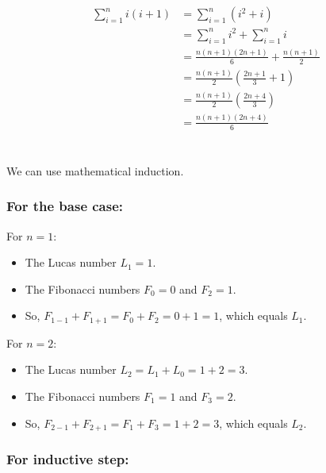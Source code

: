 \documentclass{article}
\begin{document}
\section{}

\begin{align*}
\sum_{i=1}^{n} i(i+1) &= \sum_{i=1}^{n} (i^2 + i) \\
&= \sum_{i=1}^{n} i^2 + \sum_{i=1}^{n} i \\
&= \frac{n(n + 1)(2n + 1)}{6} + \frac{n(n+1)}{2} \\
&= \frac{n(n+1)}{2} \left( \frac{2n+1}{3} + 1 \right) \\
&= \frac{n(n+1)}{2} \left( \frac{2n+4}{3} \right) \\
&= \frac{n(n+1)(2n+4)}{6}
\end{align*}


\section{}

We can use mathematical induction. 

\subsubsection*{For the base case:}

For \(n = 1\):
\begin{itemize}
    \item The Lucas number \(L_1 = 1\).
    \item The Fibonacci numbers \(F_0 = 0\) and \(F_2 = 1\).
    \item So, \(F_{1-1} + F_{1+1} = F_0 + F_2 = 0 + 1 = 1\), which equals \(L_1\).
\end{itemize}

For \(n = 2\):
\begin{itemize}
    \item The Lucas number \(L_2 = L_1 + L_0 = 1 + 2 = 3\).
    \item The Fibonacci numbers \(F_1 = 1\) and \(F_3 = 2\).
    \item So, \(F_{2-1} + F_{2+1} = F_1 + F_3 = 1 + 2 = 3\), which equals \(L_2\).
\end{itemize}



\subsubsection*{For inductive step:}
\end{document}
